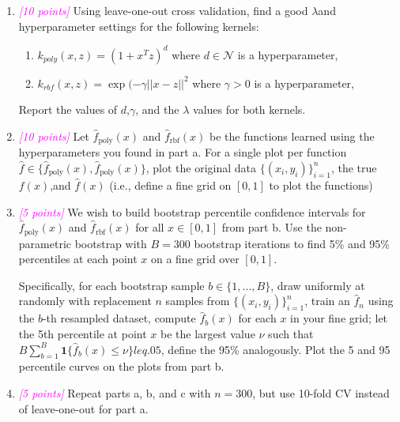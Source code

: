 \documentclass{article}
\newcommand{\1}{\mathbf{1}}
\newcommand{\N}{\mathcal{N}} %
\newcommand{\points}[1]{\small\textcolor{magenta}{\emph{[#1 points]}} \normalsize}
\begin{document}
\begin{enumerate}
    \item \points{10} Using leave-one-out cross validation, find a good $\lambda$and hyperparameter settings for the following kernels:
    \begin{enumerate}
        \item $k_{poly}(x,z) = (1 +x^Tz)^d$ where $d\in\N$ is a hyperparameter,
        \item $k_{rbf}(x,z) = \exp(-\gamma ||x-z||^2$ where $\gamma>0$ is a hyperparameter,
    \end{enumerate} Report the values of $d$,$\gamma$, and the $\lambda$ values for both kernels.
    
    
    \item \points{10} Let $\widehat f_{\text{poly}}(x)$ and $\widehat f_{\text{rbf}} (x)$ be the functions learned using the hyperparameters you found in part a. For a single plot per function $\widehat f\in \{\widehat f_{\text{poly}}(x), \widehat f_{\text{poly}}(x)\}$, plot the original data $\{(x_i,y_i)\}^n_{i=1}$, the true $f(x)$,and $\widehat f(x)$ (i.e., define a fine grid on $[0,1]$ to plot the functions)
    
    
    \item \points{5} We wish to build bootstrap percentile confidence intervals for $\widehat f_{\text{poly}}(x)$ and $\widehat f_{\text{rbf}}(x)$ for all $x\in[0,1]$ from part b. Use the non-parametric bootstrap with $B=300$ bootstrap iterations to find 5\% and 95\% percentiles at each point $x$ on a fine grid over $[0,1]$. 
    
    Specifically, for each bootstrap sample $b\in\{1,...,B\}$, draw uniformly at randomly with replacement $n$ samples from $\{(x_i,y_i)\}^n_{i=1}$, train an $\widehat f_n$ using the $b$-th resampled dataset, compute $\widehat f_b(x)$ for each $x$ in your fine grid; let the 5th percentile at point $x$ be the largest value $\nu$ such that $B\sum^B_{b=1} \1\{\widehat f_b (x) \leq \nu \} leq .05$, define the 95\% analogously. Plot the 5 and 95 percentile curves on the plots from part b.
    
    \item \points{5} Repeat parts a, b, and c with $n=300$, but use 10-fold CV instead of leave-one-out for part a.
    

\end{enumerate}
\end{document}
